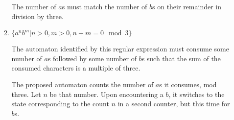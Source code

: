 \documentclass[letterpaper,11pt]{article}
\begin{document}
\begin{enumerate}
\begin{enumerate}
                The number of $a$s must match the number of $b$s on their
                remainder in division by three.

                \begin{figure}[H]
                    \centering

                \end{figure}

            \item
                $\{a^n b^m | n > 0, m > 0, n + m = 0 \mod 3\}$

                The automaton identified by this regular expression must
                consume some number of $a$s followed by some number of $b$s
                such that the sum of the consumed characters is a multiple of
                three.

                The proposed automaton counts the number of $a$s it consumes,
                mod three. Let $n$ be that number. Upon encountering a $b$, it
                switches to the state corresponding to the count $n$ in a
                second counter, but this time for $b$s.
        \end{enumerate}


\end{enumerate}
\end{document}
